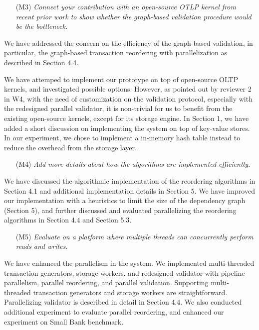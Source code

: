 \documentclass{article}
\begin{document}
\begin{itemize}
\item[(M3)]  \emph{Connect your contribution with an open-source OTLP kernel from recent prior work to show whether the graph-based validation procedure would be the bottleneck.}
\end{itemize}
We have addressed the concern on the efficiency of the graph-based validation, in particular, the graph-based transaction reordering with parallelization as described in Section 4.4. 

We have attemped to implement our prototype on top of open-source OLTP kernels, and investigated possible options. However, as pointed out by reviewer 2 in W4, with the need of customization on the validation protocol, especially with the redesigned parallel validator,  it is non-trivial for us to benefit from the existing open-source kernels, except for its storage engine. In Section 1, we have added a short discussion on implementing the system on top of key-value stores. In our experiment, we chose to implement a in-memory hash table instead to reduce the overhead from the storage layer.

\begin{itemize}
\item[(M4)]  \emph{Add more details about how the algorithms are implemented efficiently.}
\end{itemize}
We have discussed the algorithmic implementation of the reordering algorithms in Section 4.1 and additional implementation details in Section 5. We have improved our implementation with a heuristics to limit the size of the dependency graph (Section 5), and further discussed and evaluated parallelizing the reordering algorithms in Section 4.4 and Section 5.3. 

\begin{itemize}
\item[(M5)]  \emph{Evaluate on a platform where multiple threads can concurrently perform reads and writes.}
\end{itemize}
We have enhanced the parallelism in the system. We implemented multi-threaded transaction generators, storage workers, and redesigned validator with pipeline parallelism, parallel reordering, and parallel validation. Supporting multi-threaded transaction generators and storage workers are straightforward. Parallelizing validator is described in detail in Section 4.4. We also conducted additional experiment to evaluate parallel reordering, and enhanced our experiment on Small Bank benchmark.
\end{document}
